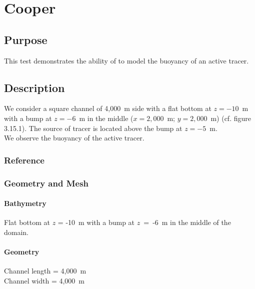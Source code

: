 \chapter{Cooper}
%

%
\section{Purpose}
%
This test demonstrates the ability of  to model the buoyancy
of an active tracer.
%
\section{Description}
%
We consider a square channel of 4,000~m side with a flat bottom at
$z = -10$~m with a bump at $z = -6$~m in the middle
($x = 2,000$~m; $y = 2,000$~m) (cf. figure 3.15.1).
The source of tracer is located above the bump at $z = -5$~m.\\
We observe the buoyancy of the active tracer.
%
%
%
\subsection{Reference}
%
%
%
\subsection{Geometry and Mesh}
%
\subsubsection{Bathymetry}
Flat bottom at $z$ = -10~m with a bump at $z$~=~-6~m in the middle of the domain.
\subsubsection{Geometry}
Channel length = 4,000~m\\
Channel width = 4,000~m
